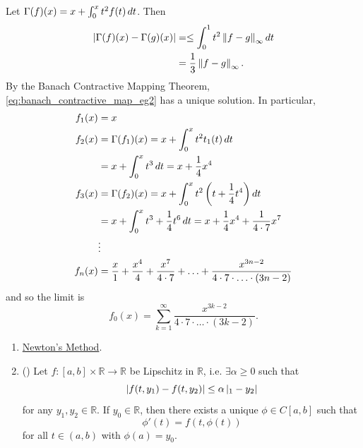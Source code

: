 \documentclass[notoc,notitlepage]{tufte-book}
\newcommand{\norm}[1]{\left\| #1 \right\|}
\begin{document}
\begin{solution}
  Let $\Gamma(f)(x) = x + \int_{0}^{x} t^2 f(t) \mathop{}\!d{t}$. Then
  \begin{align*}
    \abs{ \Gamma(f)(x) - \Gamma(g)(x) } &= \leq \int_{0}^{1} t^2 \norm{ f - g }_\infty \dif{t}  \\
                                        &= \frac{1}{3}\norm{ f - g }_\infty.
  \end{align*}
  By the Banach Contractive Mapping Theorem, \cref{eq:banach_contractive_map_eg2} has a unique solution. In particular,
  \begin{align*}
    f_1(x) &= x \\
    f_2(x) &= \Gamma(f_1)(x) = x + \int_{0}^{x} t^2 t_1(t) \mathop{}\!d{t} \\
           &= x + \int_{0}^{x} t^3 \mathop{}\!d{t} = x + \frac{1}{4}x^4 \\
    f_3(x) &= \Gamma(f_2)(x) = x + \int_{0}^{x} t^2 \left( t + \frac{1}{4} t^4 \right) \mathop{}\!d{t} \\
           &= x + \int_{0}^{x} t^3 + \frac{1}{4} t^6 \mathop{}\!d{t} = x + \frac{1}{4} x^4 + \frac{1}{4 \cdot 7} x^7 \\
           &\vdots \\
    f_n(x) &= \frac{x}{1} + \frac{x^4}{4} + \frac{x^7}{4 \cdot 7} + \hdots + \frac{x^{3n - 2}}{4 \cdot 7 \cdot \hdots \cdot (3n - 2)}
  \end{align*}
  and so the limit is
  \begin{equation*}
    f_0(x) = \sum_{k=1}^{\infty} \frac{x^{3k - 2}}{4 \cdot 7 \cdot \hdots \cdot (3k - 2)}.
  \end{equation*}
\end{solution}

\begin{eg}
  \begin{enumerate}
    \item \href{https://en.wikipedia.org/wiki/Newton%27s_method}{Newton's Method}.
      \item () Let $f : [a, b] \times \mathbb{R} \to \mathbb{R}$ be Lipschitz in $\mathbb{R}$, i.e. $\exists \alpha \geq 0$ such that
        \begin{equation*}
          \left| f(t, y_1) - f(t, y_2) \right| \leq \alpha \left| _1 - y_2 \right|
        \end{equation*}
        for any $y_1, y_2 \in \mathbb{R}$. If $y_0 \in \mathbb{R}$, then there exists a unique $\phi \in C[a, b]$ such that
        \begin{equation*}
          \phi'(t) = f(t, \phi(t))
        \end{equation*}
        for all $t \in (a, b)$ with $\phi(a) = y_0$.
  \end{enumerate}
\end{eg}
\end{document}
